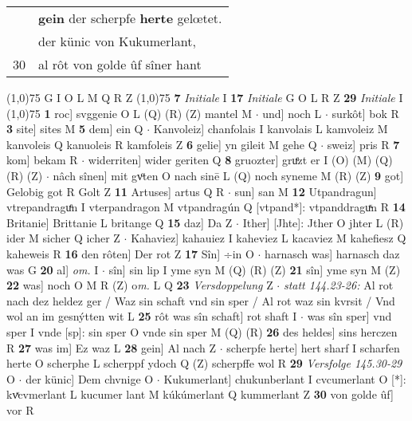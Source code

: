 \documentclass[8pt,a4paper,notitlepage]{article}
\begin{document}
\begin{table}[ht]
\begin{minipage}[t]{0.5\linewidth}
\begin{tabular}{rl}
 & \textbf{gein} der scherpfe \textbf{herte} gelœtet.\\ 
 & der künic von Kukumerlant,\\ 
30 & al rôt von golde ûf sîner hant\\ 
\end{tabular}
\scriptsize
\line(1,0){75} \newline
G I O L M Q R Z \newline
\line(1,0){75} \newline
\textbf{7} \textit{Initiale} I  \textbf{17} \textit{Initiale} G O L R Z  \textbf{29} \textit{Initiale} I  \newline
\line(1,0){75} \newline
\textbf{1} roc] svggenie O L (Q) (R) (Z) mantel M  $\cdot$ und] noch L  $\cdot$ surkôt] bok R \textbf{3} site] sites M \textbf{5} dem] ein Q  $\cdot$ Kanvoleiz] chanfolais I kanvolais L kamvoleiz M kanvoleis Q kanuoleis R kamfoleis Z \textbf{6} gelie] yn gileit M gehe Q  $\cdot$ sweiz] pris R \textbf{7} kom] bekam R  $\cdot$ widerriten] wider geriten Q \textbf{8} gruozter] gruͤzt er I (O) (M) (Q) (R) (Z)  $\cdot$ nâch sînen] mit gvͦten O nach sinē L (Q) noch syneme M (R) (Z) \textbf{9} got] Gelobig got R Golt Z \textbf{11} Artuses] artus Q R  $\cdot$ sun] san M \textbf{12} Utpandragun] vtrepandraguͤn I vterpandragon M vtpandragún Q [vtpand*]: vtpanddraguͯn R \textbf{14} Britanie] Brittanie L britange Q \textbf{15} daz] Da Z  $\cdot$ Ither] [Jhte]: Jther O jhter L (R) ider M sicher Q icher Z  $\cdot$ Kahaviez] kahauiez I kaheviez L kacaviez M kahefiesz Q kaheweis R \textbf{16} den rôten] Der rot Z \textbf{17} Sîn] ÷in O  $\cdot$ harnasch was] harnasch daz was G \textbf{20} al] \textit{om.} I  $\cdot$ sîn] sin lip I yme syn M (Q) (R) (Z) \textbf{21} sîn] yme syn M (Z) \textbf{22} was] noch O M R (Z) o\textit{m. } L Q \textbf{23} \textit{Versdoppelung} Z   $\cdot$ \textit{statt 144.23-26:} Al rot nach dez heldez ger / Waz sin schaft vnd sin sper / Al rot waz sin kvrsit / Vnd wol an im gesnýtten wit L  \textbf{25} rôt was sîn schaft] rot shaft I  $\cdot$ was sîn sper] vnd sper I vnde [sp]: sin sper O vnde sin sper M (Q) (R) \textbf{26} des heldes] sins herczen R \textbf{27} was im] Ez waz L \textbf{28} gein] Al nach Z  $\cdot$ scherpfe herte] hert sharf I scharfen herte O scherphe L scherppf ydoch Q (Z) scherpffe wol R \textbf{29} \textit{Versfolge 145.30-29} O   $\cdot$ der künic] Dem chvnige O  $\cdot$ Kukumerlant] chukunberlant I cvcumerlant O [*]: kvͯcvmerlant L kucumer lant M kúkúmerlant Q kummerlant Z \textbf{30} von golde ûf] vor R \newline

\end{minipage}
\end{table}
\end{document}
